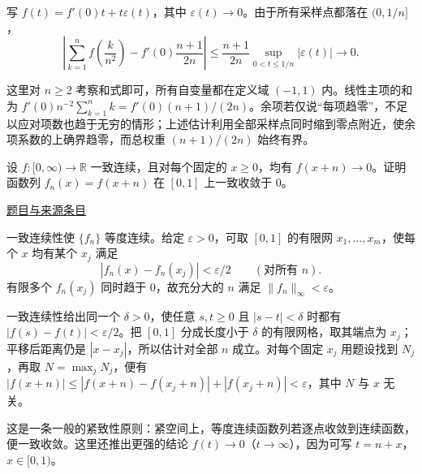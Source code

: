 \documentclass[UTF8,12pt,a4paper,fontset=fandol]{ctexart}
\begin{document}
\begin{solve}\label{ans:fin01-all:5}

写 $f(t)=f'(0)t+t\varepsilon(t)$，其中 $\varepsilon(t)\to0$。由于所有采样点都落在 $(0,1/n]$，
\[
\left|\sum_{k=1}^n f\!\left(\frac{k}{n^2}\right)
-f'(0)\frac{n+1}{2n}\right|
\le\frac{n+1}{2n}\sup_{0<t\le1/n}|\varepsilon(t)|\longrightarrow0.
\]

这里对 $n\ge2$ 考察和式即可，所有自变量都在定义域 $(-1,1)$ 内。线性主项的和为 $f'(0)n^{-2}\sum_{k=1}^nk=f'(0)(n+1)/(2n)$。余项若仅说“每项趋零”，不足以应对项数也趋于无穷的情形；上述估计利用全部采样点同时缩到零点附近，使余项系数的上确界趋零，而总权重 $(n+1)/(2n)$ 始终有界。

\end{solve}

\begin{example}[来源序号6]\label{ex:fin01-all:6}\label{pr:fin01-all:6}

设 $f:[0,\infty)\to\mathbb R$ 一致连续，且对每个固定的 $x\ge0$，均有 $f(x+n)\to0$。证明函数列 $f_n(x)=f(x+n)$ 在 $[0,1]$ 上一致收敛于 $0$。

\par\href{https://github.com/lzxcr/cmc-mathematics/blob/64916fa1fdbc3e444a652eca204d5669058ee321/src/problems/finals/01/06.md}{题目与来源条目}

\end{example}

\begin{solve}\label{ans:fin01-all:6}

一致连续性使 $\{f_n\}$ 等度连续。给定 $\varepsilon>0$，可取 $[0,1]$ 的有限网 $x_1,\ldots,x_m$，使每个 $x$ 均有某个 $x_j$ 满足
\[
|f_n(x)-f_n(x_j)|<\varepsilon/2\qquad(\text{对所有 }n).
\]
有限多个 $f_n(x_j)$ 同时趋于 $0$，故充分大的 $n$ 满足 $\|f_n\|_\infty<\varepsilon$。

一致连续性给出同一个 $\delta>0$，使任意 $s,t\ge0$ 且 $|s-t|<\delta$ 时都有 $|f(s)-f(t)|<\varepsilon/2$。把 $[0,1]$ 分成长度小于 $\delta$ 的有限网格，取其端点为 $x_j$；平移后距离仍是 $|x-x_j|$，所以估计对全部 $n$ 成立。对每个固定 $x_j$ 用题设找到 $N_j$，再取 $N=\max_jN_j$，便有 $|f(x+n)|\le|f(x+n)-f(x_j+n)|+|f(x_j+n)|<\varepsilon$，其中 $N$ 与 $x$ 无关。

\end{solve}

\begin{remark}[方法与条件]这是一条一般的紧致性原则：紧空间上，等度连续函数列若逐点收敛到连续函数，便一致收敛。这里还推出更强的结论 $f(t)\to0$（$t\to\infty$），因为可写 $t=n+x$，$x\in[0,1)$。\end{remark}
\end{document}

